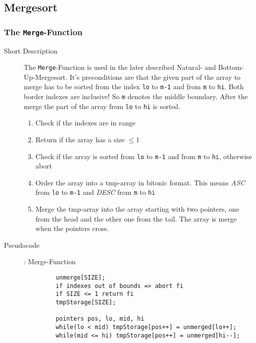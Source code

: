 \documentclass[11pt]{amsart}
\begin{document}
\subsection{Mergesort}
\subsubsection{The \texttt{Merge}-Function}
\begin{description}
	\item[Short Description] The \texttt{Merge}-Function is used in the later described Natural- and Bottom-Up-Mergesort. It's preconditions are that the given part of the array to merge has to be sorted from the index \texttt{lo} to \texttt{m-1} and from \texttt{m} to \texttt{hi}. Both border indexes are inclusive! So \texttt{m} denotes the middle boundary. After the merge the part of the array from \texttt{lo} to \texttt{hi} is sorted.
		\begin{enumerate}
			\item Check if the indexes are in range
			\item Return if the array has a size $\leq 1$
			\item Check if the array is sorted from \texttt{lo} to \texttt{m-1} and from \texttt{m} to \texttt{hi}, otherwise abort
			\item Order the array into a tmp-array in bitonic format. This means \textit{ASC} from \texttt{lo} to \texttt{m-1} and \textit{DESC} from \texttt{m} to \texttt{hi} %
			\item Merge the tmp-array into the array starting with two pointers, one from the head and the other one from the tail. The array is merge when the pointers cross.
		\end{enumerate}
	\item[Pseudocode]: Merge-Function
		\begin{lstlisting}
		 unmerge[SIZE];
		 if indexes out of bounds => abort fi
		 if SIZE <= 1 return fi
		 tmpStorage[SIZE];
		 
		 pointers pos, lo, mid, hi
		 while(lo < mid) tmpStorage[pos++] = unmerged[lo++];
		 while(mid <= hi) tmpStorage[pos++] = unmerged[hi--]; 
		 

\end{lstlisting}
\end{description}
\end{document}
